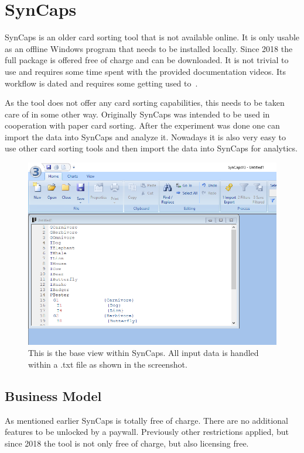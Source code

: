 \chapter{SynCaps}

\label{chap:SynCaps}

SynCaps is an older card sorting tool that is not available online. It
is only usable as an offline Windows program that needs to be 
installed locally. Since 2018 the full package is offered free of 
charge and can be downloaded. It is not trivial to use and requires 
some time spent with the provided documentation videos. Its workflow
is dated and requires some getting used to~\parencite{SynCaps}.

As the tool does not offer any card sorting capabilities, this needs
to be taken care of in some other way. Originally SynCaps was intended
to be used in cooperation with paper card sorting. After the
experiment was done one can import the data into SynCaps and analyze
it. Nowadays it is also very easy to use other card sorting tools and
then import the data into SynCaps for analytics.

\begin{figure}[tp] 
\centering
\includegraphics[keepaspectratio,width=\linewidth,height=\halfh]{images/syncaps-sorting.png}
\caption[SynCaps Application] { This is the base view within SynCaps.
All input data is handled within a .txt file as shown in the screenshot.
 }
\label{fig:SynCaps1}
\end{figure}

\section{Business Model}
As mentioned earlier SynCaps is totally free of charge. There are no
additional features to be unlocked by a paywall. Previously other 
restrictions applied, but since 2018 the tool is not only free of
charge, but also licensing free.

